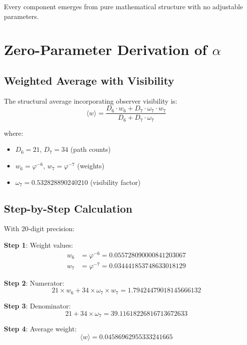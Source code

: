 \documentclass[%
 reprint,
 amsmath,amssymb,
 aps,
 prd,
 10pt,
 nofootinbib,      %
 longbibliography  %
]{revtex4-2}
\theoremstyle{definition}
\theoremstyle{remark}
\begin{document}
Every component emerges from pure mathematical structure with no adjustable parameters.

\section{Zero-Parameter Derivation of \texorpdfstring{$\alpha$}{α}}
\label{sec:derivation}

\subsection{Weighted Average with Visibility}

The structural average incorporating observer visibility is:
\begin{equation}
\langle w \rangle = \frac{D_6 \cdot w_6 + D_7 \cdot \omega_7 \cdot w_7}{D_6 + D_7 \cdot \omega_7}
\end{equation}

where:
\begin{itemize}
\item $D_6 = 21$, $D_7 = 34$ (path counts)
\item $w_6 = \varphi^{-6}$, $w_7 = \varphi^{-7}$ (weights)
\item $\omega_7 = 0.532828890240210$ (visibility factor)
\end{itemize}

\subsection{Step-by-Step Calculation}

With 20-digit precision:

\textbf{Step 1}: Weight values:
\begin{align}
w_6 &= \varphi^{-6} = 0.055728090000841203067 \\
w_7 &= \varphi^{-7} = 0.034441853748633018129
\end{align}

\textbf{Step 2}: Numerator:
\begin{equation}
21 \times w_6 + 34 \times \omega_7 \times w_7 = 1.79424479018145666132
\end{equation}

\textbf{Step 3}: Denominator:
\begin{equation}
21 + 34 \times \omega_7 = 39.11618226816713672633
\end{equation}

\textbf{Step 4}: Average weight:
\begin{equation}
\langle w \rangle = 0.04586962955333241665
\end{equation}
\end{document}
